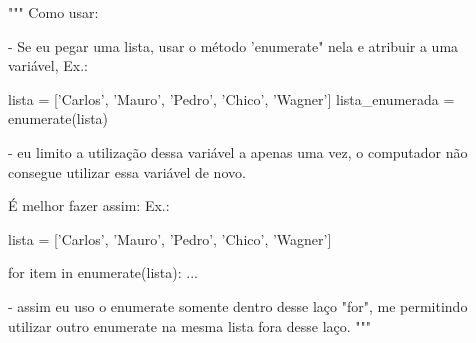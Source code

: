 """
Como usar:

- Se eu pegar uma lista, usar o método 'enumerate" nela e atribuir a uma variável,
Ex.:

lista = ['Carlos', 'Mauro', 'Pedro', 'Chico', 'Wagner']
lista_enumerada = enumerate(lista)

- eu limito a utilização dessa variável a apenas uma vez, o computador não consegue
utilizar essa variável de novo.

É melhor fazer assim:
Ex.: 

lista = ['Carlos', 'Mauro', 'Pedro', 'Chico', 'Wagner']

for item in enumerate(lista):
...

- assim eu uso o enumerate somente dentro desse laço "for",
me permitindo utilizar outro enumerate na mesma lista fora desse laço.
"""